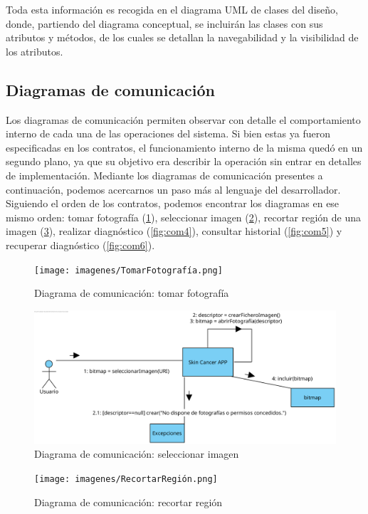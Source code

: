  Toda esta información es recogida en el diagrama UML de clases del diseño, donde, partiendo del diagrama conceptual, se incluirán las clases con sus atributos y métodos, de los cuales se detallan la navegabilidad y la visibilidad de los atributos.
 
 \subsection{Diagramas de comunicación}
 
 Los diagramas de comunicación permiten observar con detalle el comportamiento interno de cada una de las operaciones del sistema. Si bien estas ya fueron especificadas en los contratos, el funcionamiento interno de la misma quedó en un segundo plano, ya que su objetivo era describir la operación sin entrar en detalles de implementación. Mediante los diagramas de comunicación presentes a continuación, podemos acercarnos un paso más al lenguaje del desarrollador. Siguiendo el orden de los contratos, podemos encontrar los diagramas  en ese mismo orden: tomar fotografía (\ref{fig:com1}),  seleccionar imagen (\ref{fig:com2}), recortar región de una imagen (\ref{fig:com3}), realizar diagnóstico (\ref{fig:com4}), consultar historial (\ref{fig:com5}) y recuperar diagnóstico (\ref{fig:com6}).
 
\begin{figure}[H]
 	\centering
 	\texttt{[image: imagenes/TomarFotografía.png]}
 	\caption{Diagrama de comunicación: tomar fotografía}
 	\label{fig:com1}
 \end{figure}
 
 
\begin{figure}[H]
 	\centering
 	\includegraphics[scale = 0.8]{imagenes/SeleccionarImagen.png}
 	\caption{Diagrama de comunicación: seleccionar imagen}
 	\label{fig:com2}
 \end{figure}
 
\begin{figure}[H]
 	\centering
 	\texttt{[image: imagenes/RecortarRegión.png]}
 	\caption{Diagrama de comunicación: recortar región}
 	\label{fig:com3}
 \end{figure}
 
